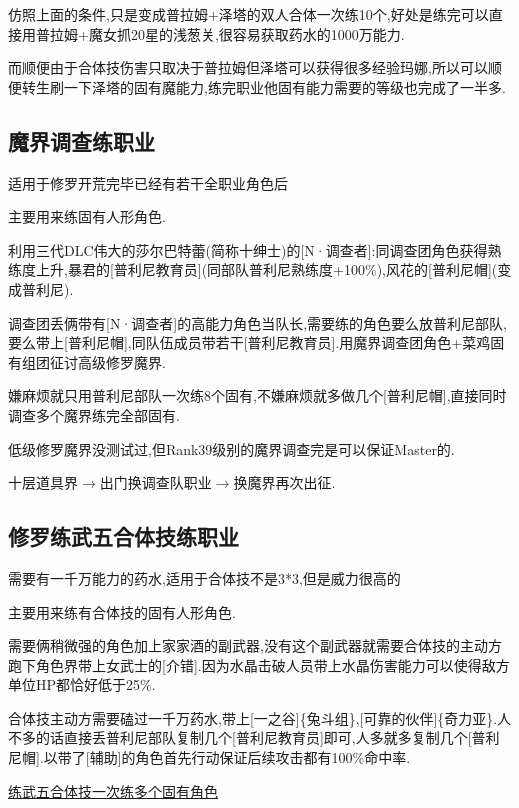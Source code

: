 	仿照上面的条件,只是变成普拉姆+泽塔的双人合体一次练10个,好处是练完可以直接用普拉姆+魔女抓20星的浅葱关,很容易获取药水的1000万能力.

	而顺便由于合体技伤害只取决于普拉姆但泽塔可以获得很多经验玛娜,所以可以顺便转生刷一下泽塔的固有魔能力,练完职业他固有能力需要的等级也完成了一半多.

	\subsection{魔界调查练职业}

	{\color{red}适用于修罗开荒完毕已经有若干全职业角色后}

	主要用来练固有人形角色.

	利用三代DLC伟大的莎尔巴特蕾(简称十绅士)的[N·调查者]:同调查团角色获得熟练度上升,暴君的[普利尼教育员](同部队普利尼熟练度+100\%),风花的[普利尼帽](变成普利尼).
	
	调查团丢俩带有[N·调查者]的高能力角色当队长,需要练的角色要么放普利尼部队,要么带上[普利尼帽],同队伍成员带若干[普利尼教育员].用魔界调查团角色+菜鸡固有组团征讨高级修罗魔界.

	嫌麻烦就只用普利尼部队一次练8个固有,不嫌麻烦就多做几个[普利尼帽],直接同时调查多个魔界练完全部固有.

	低级修罗魔界没测试过,但Rank39级别的魔界调查完是可以保证Master的.

	十层道具界$\longrightarrow$出门换调查队职业$\longrightarrow$换魔界再次出征.

	\newpage

	\subsection{修罗练武五合体技练职业}

	{\color{red}需要有一千万能力的药水,适用于合体技不是3*3,但是威力很高的}

	主要用来练有合体技的固有人形角色.

	需要俩稍微强的角色加上家家酒的副武器,没有这个副武器就需要合体技的主动方跑下角色界带上女武士的[介错].因为水晶击破人员带上水晶伤害能力可以使得敌方单位HP都恰好低于25\%.

	合体技主动方需要磕过一千万药水,带上[一之谷]\{兔斗组\},[可靠的伙伴]\{奇力亚\}.人不多的话直接丢普利尼部队复制几个[普利尼教育员]即可,人多就多复制几个[普利尼帽].以带了[辅助]的角色首先行动保证后续攻击都有100\%命中率.

	\href{http://www.bilibili.com/video/av2966618/}{练武五合体技一次练多个固有角色}

	\newpage

